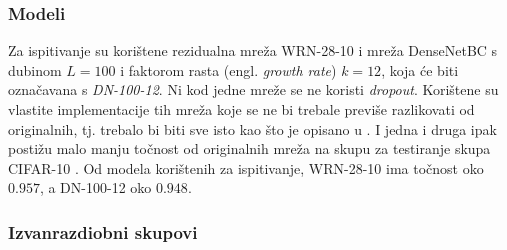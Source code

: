 \documentclass[utf8, diplomski, lmodern]{fer}
\begin{document}
\subsubsection{Modeli}

Za ispitivanje su korištene rezidualna mreža WRN-28-10 \citep{Zagoruyko:2016:WRN} i mreža DenseNetBC \citep{Huang:2016:DCCN} s dubinom $L=100$ i faktorom rasta (engl. \textit{growth rate}) $k=12$, koja će biti označavana s \textit{DN-100-12}. Ni kod jedne mreže se ne koristi \textit{dropout}. Korištene su vlastite implementacije tih mreža koje se ne bi trebale previše razlikovati od originalnih, tj. trebalo bi biti sve isto kao što je opisano u \citet{Zagoruyko:2016:WRN,Huang:2016:DCCN}. I jedna i druga ipak postižu malo manju točnost od originalnih mreža na skupu za testiranje skupa CIFAR-10 \citep{Krizhevsky:2009:LMLFTI}. Od modela korištenih za ispitivanje, WRN-28-10 ima točnost oko $0.957$, a DN-100-12 oko $0.948$.

\subsubsection{Izvanrazdiobni skupovi}
\end{document}
